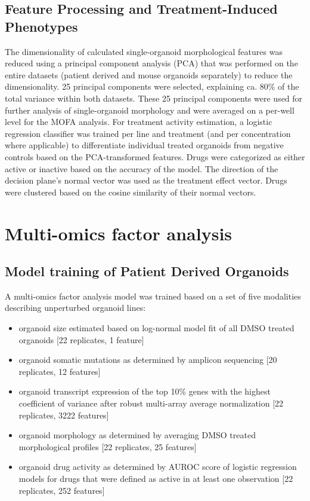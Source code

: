 \begin{flushleft}
\subsection{Feature Processing and Treatment-Induced Phenotypes}
The dimensionality of calculated single-organoid morphological features was reduced using a principal component analysis (PCA) that was performed on the entire datasets (patient derived and mouse organoids separately) to reduce the dimensionality. 25 principal components were selected, explaining ca. 80\% of the total variance within both datasets. These 25 principal components were used for further analysis of single-organoid morphology and were averaged on a per-well level for the MOFA analysis.
\bigbreak
For treatment activity estimation, a logistic regression classifier was trained per line and treatment (and per concentration where applicable) to differentiate individual treated organoids from negative controls based on the PCA-transformed features. Drugs were categorized as either active or inactive based on the accuracy of the model. The direction of the decision plane's normal vector was used as the treatment effect vector. Drugs were clustered based on the cosine similarity of their normal vectors.


\section{Multi-omics factor analysis}
\subsection{Model training of Patient Derived Organoids}
A multi-omics factor analysis model \parencite{argelaguetMultiOmicsFactorAnalysis2018b} was trained based on a set of five modalities describing unperturbed organoid lines:

\begin{itemize}
    \item organoid size estimated based on log-normal model fit of all DMSO treated organoids [22 replicates, 1 feature]
    \item organoid somatic mutations as determined by amplicon sequencing [20 replicates, 12 features]
    \item organoid transcript expression of the top 10\% genes with the highest coefficient of variance after robust multi-array average normalization [22 replicates, 3222 features]
    \item organoid morphology as determined by averaging DMSO treated morphological profiles [22 replicates, 25 features]
    \item organoid drug activity as determined by AUROC score of logistic regression models for drugs that were defined as active in at least one observation [22 replicates, 252 features]
\end{itemize}



\end{flushleft}
